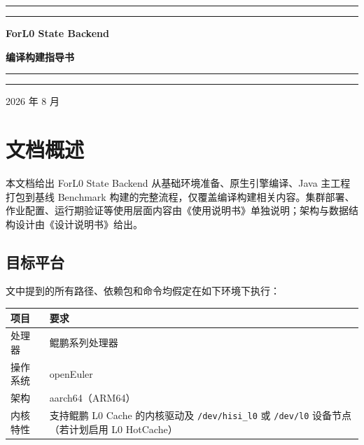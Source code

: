 \documentclass[a4paper,11pt]{article}
\newcommand{\project}{ForL0 State Backend}
\newcommand{\coverrule}{{\color{accent}\rule{\linewidth}{0.9pt}}}
\newcommand{\coverrulethin}{{\color{accent!55}\rule{\linewidth}{0.3pt}}}
\begin{document}
\begin{titlepage}
\thispagestyle{empty}
\centering
\vspace*{5.5cm}

\coverrule
\vspace{2pt}
\coverrulethin

\vspace{1.6cm}
{\sffamily\huge\bfseries\color{accent} \project\par}
\vspace{0.8cm}
{\sffamily\LARGE\bfseries 编译构建指导书\par}

\vspace{1.6cm}
\coverrulethin
\vspace{2pt}
\coverrule

\vfill

{\sffamily\large\color{accent!85} 2026 年 8 月\par}

\vspace{1.2cm}
\end{titlepage}

\pagestyle{plain}
\tableofcontents
\clearpage
{}
\setcounter{page}{1}
\pagestyle{fancy}

\section{文档概述}

本文档给出 \project{} 从基础环境准备、原生引擎编译、Java 主工程打包到基线 Benchmark 构建的完整流程，仅覆盖编译构建相关内容。集群部署、作业配置、运行期验证等使用层面内容由《使用说明书》单独说明；架构与数据结构设计由《设计说明书》给出。

\subsection{目标平台}

文中提到的所有路径、依赖包和命令均假定在如下环境下执行：

\begin{table}[H]
\centering
\small
\begin{tabularx}{\textwidth}{L{3.2cm} X}
\toprule
\textbf{项目} & \textbf{要求} \\
\midrule
处理器 & 鲲鹏系列处理器 \\
操作系统 & openEuler \\
架构 & aarch64（ARM64） \\
内核特性 & 支持鲲鹏 L0 Cache 的内核驱动及 \texttt{/dev/hisi\_l0} 或 \texttt{/dev/l0} 设备节点（若计划启用 L0 HotCache） \\
\bottomrule
\end{tabularx}
\end{table}
\end{document}
